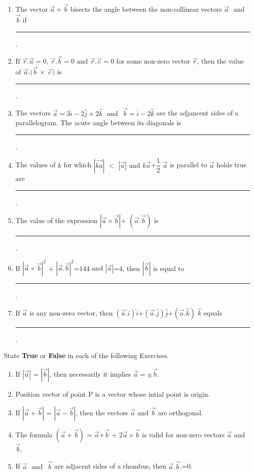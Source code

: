 \documentclass{article}
\providecommand{\abs}[1]{\left\vert#1\right\vert}
\begin{document}
\begin{enumerate}[resume]
\item The vector $\vec{a}+\vec{b}$ bisects the angle between the non-collinear vectors $\vec{a}$ $\text{ and }$ $\vec{b}$ if \rule{1cm}{0.15mm}.


\item If $\vec{r}.\vec{a}=0$, $\vec{r}.\vec{b}=0$ $\text{and}$ $\vec{r}.\vec{c}=0$ for some non-zero vector $\vec{r}$, then the value of $\vec{a}.(\vec{b}$ $\times$ $\vec{c})$ is \rule{1cm}{0.15mm}.


\item The vectors $\vec{a}=3\hat{i}-2\hat{j}+2\hat{k}$ $\text{ and }$ $\vec{b}=\hat{i}-2\hat{k}$ are the adjancent sides of a parallelogram. The acute angle between its diagonals is \rule{1cm}{0.15mm}.


\item The values of $k$ for which $\abs{\vec{ka}}$ $<$ $\abs{\vec{a}}$ $\text{and}$ $k\vec{a}$+$\dfrac{1}{2}$ $\vec{a}$ is parallel to $\vec{a}$ holds true are \rule{1cm}{0.15mm}.


\item The value of the expression $\abs{\vec{a}\times\vec{b}}$+ $({\vec{a}.\vec{b}})$ is \rule{1cm}{0.15mm}.


\item If $\abs{\vec{a}\times\vec{b}}^2$ + $\abs{\vec{a}.\vec{b}}^2$=144 $\text{and}$  $\abs{\vec{a}}$=4, then $\abs{\vec{b}}$ is equal to \rule{1cm}{0.15mm}.


\item If $\vec{a}$ is  any non-zero vector, then $(\vec{a}.\hat{i})\hat{i}$+$(\vec{a}.\hat{j})\hat{j}$+$(\vec{a}.\hat{k})$ $\hat{k}$ equals \rule{1cm}{0.15mm}.

\end{enumerate}

State \textbf{True} or \textbf{False} in each of the following Exercises.

\begin{enumerate}[resume]

\item If $\abs{\vec{a}}$ = $\abs{\vec{b}}$, then necessarily it implies $\vec{a}=\pm\vec{b}$.


\item Position vector of point P is a vector whose intial point is origin.


\item If $\abs{\vec{a}+\vec{b}}$ = $\abs{\vec{a}-\vec{b}}$, then the vectors $\vec{a}$ $\text {and}$ $\vec{b}$ are orthogonal.


\item The formula $(\vec{a}+\vec{b})$ = $\vec{a}$+$\vec{b}$ + 2$\vec{a}\times\vec{b}$ is valid for non-zero vectors $\vec{a}$ $\text{and}$ $\vec{b}$.


\item If $\vec{a}$ $\text{ and }$ $\vec{b}$ are adjacent sides of a rhombus, then $\vec{a}.\vec{b}$.=0.
	\end{enumerate}
\end{document}
